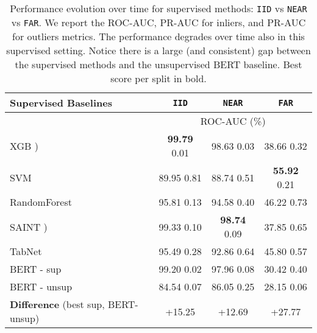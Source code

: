 \documentclass{article}
\begin{document}
\begingroup
\begin{table}[t]
\begin{center}
    \caption{Performance evolution over time for supervised methods: \texttt{IID} vs \texttt{NEAR} vs \texttt{FAR}. We report the ROC-AUC, PR-AUC for inliers, and PR-AUC for outliers metrics. The performance degrades over time also in this supervised setting. Notice there is a large (and consistent) gap between the supervised methods and the unsupervised BERT baseline. Best score per split in bold.}
    
    \begin{tabular}{lccc}
    \toprule
    Supervised Baselines & \texttt{IID}      & \texttt{NEAR}    & \texttt{FAR}     \\
    \midrule
                 & \multicolumn{3}{c}{ROC-AUC (\%) }  \\
    \cmidrule(lr){2-4}
    XGB \cite{chen2015xgboost})          & \textbf{99.79}  \small 0.01     & 98.63  \small 0.03    & 38.66   \small 0.32  \\
    SVM \cite{cortes1995support}         & 89.95  \small 0.81     & 88.74  \small	0.51    & \textbf{55.92}  \small	0.21    \\
    RandomForest \cite{liaw2002classification} & 95.81  \small	0.13     & 94.58  \small	0.40    & 46.22  \small	0.73    \\
    SAINT \cite{somepalli2021saint})       & 99.33  \small	0.10     & \textbf{98.74}  \small 0.09     & 37.85  \small 0.65   \\
    TabNet \cite{arik2021tabnet}       & 95.49  \small	0.28     & 92.86  \small	0.64    & 45.80  \small	0.57      \\
    BERT \cite{devlin2018bert} - sup     & 99.20  \small	0.02     & 97.96  \small	0.08      & 30.42  \small	0.40    \\
    \midrule
    BERT \cite{devlin2018bert} - unsup   & 84.54  \small 0.07   & 86.05  \small 0.25       & 28.15  \small 0.06    \\
    \textbf{Difference} (best sup, BERT-unsup)   & +15.25    & +12.69      &+27.77    \\



\end{tabular}
\end{center}
\end{table}
\end{document}
